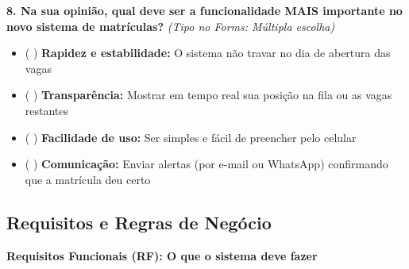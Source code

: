 \documentclass[12pt,a4paper]{article}
\begin{document}
\vspace{0.2cm}

\noindent \textbf{8. Na sua opinião, qual deve ser a funcionalidade MAIS importante no novo sistema de matrículas?} \textit{(Tipo no Forms: Múltipla escolha)}

\begin{itemize}[leftmargin=1.0cm, noitemsep]

    \item ( ) \textbf{Rapidez e estabilidade:} O sistema não travar no dia de abertura das vagas

    \item ( ) \textbf{Transparência:} Mostrar em tempo real sua posição na fila ou as vagas restantes

    \item ( ) \textbf{Facilidade de uso:} Ser simples e fácil de preencher pelo celular

    \item ( ) \textbf{Comunicação:} Enviar alertas (por e-mail ou WhatsApp) confirmando que a matrícula deu certo

\end{itemize}

\newpage

\subsection{Requisitos e Regras de Negócio}

\noindent \textbf{Requisitos Funcionais (RF): O que o sistema deve fazer}

\vspace{0.3cm}
\end{document}
